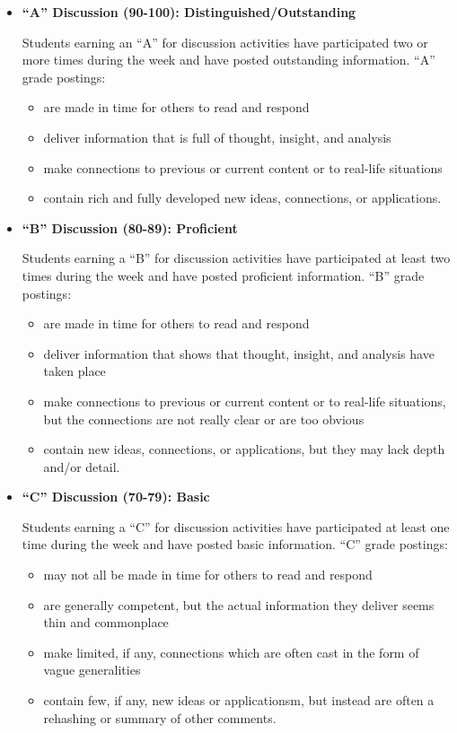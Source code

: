 \documentclass[12pt]{article}
\begin{document}
  \begin{itemize}
  \item \textbf{``A'' Discussion (90-100): Distinguished/Outstanding}

    Students earning an ``A'' for discussion activities have
    participated two or more times during the week and have posted
    outstanding information.  ``A'' grade postings:
    \begin{itemize}
    \item  are made in time for others to read and respond
    \item  deliver information that is full of thought, insight, and analysis
    \item make connections to previous or current content or to
      real-life situations
    \item contain rich and fully developed new ideas, connections, or
      applications.
    \end{itemize}

  \item     \textbf{``B'' Discussion (80-89): Proficient}

    Students earning a ``B'' for discussion activities have
    participated at least two times during the week and have posted
    proficient information. ``B'' grade postings:
    \begin{itemize}
    \item  are made in time for others to read and respond
    \item deliver information that shows that thought, insight, and
      analysis have taken place
    \item make connections to previous or current content or to
      real-life situations, but the connections are not really clear
      or are too obvious
    \item contain new ideas, connections, or applications, but they
      may lack depth and/or detail.

    \end{itemize}
  \item     \textbf{``C'' Discussion (70-79): Basic}

    Students earning a ``C'' for discussion activities have
    participated at least one time during the week and have posted
    basic information. ``C'' grade postings:
    \begin{itemize}
    \item  may not all be made in time for others to read and respond
    \item are generally competent, but the actual information they
      deliver seems thin and commonplace
    \item make limited, if any, connections which are often cast
      in the form of vague generalities
    \item contain few, if any, new ideas or applicationsm, but instead are often
      a rehashing or summary of other comments.


\end{itemize}
\end{itemize}
\end{document}
